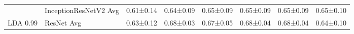 \begin{landscape}
\begin{table}[]
\begin{tabular}{clllllll}
                            & InceptionResNetV2 Avg              & 0.61±0.14                                  & 0.64±0.09                         & 0.65±0.09                         & 0.65±0.09                         & 0.65±0.09                         & 0.65±0.10                         \\
\multirow{-4}{*}{LDA 0.99}  & ResNet Avg                         & 0.63±0.12                                  & 0.68±0.03                         & 0.67±0.05                         & 0.68±0.04                         & 0.68±0.04                         & 0.64±0.10                        
\end{tabular}
\label{tab:image_classification_reduction_mm}
\end{table}
\end{landscape}


